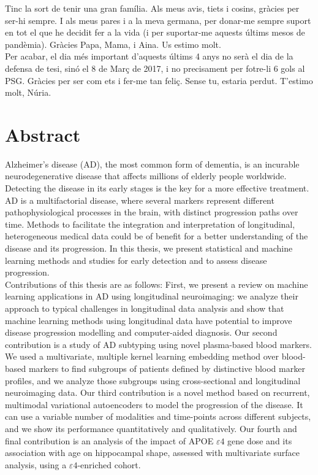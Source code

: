 \documentclass[12pt, b5paper,twoside]{tesi_upf}
\begin{document}
Tinc la sort de tenir una gran família. Als meus avis, tiets i cosins, gràcies per ser-hi sempre. I als meus pares i a la meva germana, per donar-me sempre suport en tot el que he decidit fer a la vida (i per suportar-me aquests últims mesos de pandèmia). Gràcies Papa, Mama, i Aina. Us estimo molt. \\

Per acabar, el dia més important d'aquests últims 4 anys no serà el dia de la defensa de tesi, sinó el 8 de Març de 2017, i no precisament per fotre-li 6 gols al PSG. Gràcies per ser com ets i fer-me tan feliç. Sense tu, estaria perdut. T'estimo molt, Núria. \\

\cleardoublepage


\section*{\Large \sffamily Abstract}
Alzheimer's disease (AD), the most common form of dementia, is an incurable neurodegenerative disease that affects millions of elderly people worldwide. Detecting the disease in its early stages is the key for a more effective treatment. AD is a multifactorial disease, where several markers represent different pathophysiological processes in the brain, with distinct progression paths over time. Methods to facilitate the integration and interpretation of longitudinal, heterogeneous medical data could be of benefit for a better understanding of the disease and its progression. In this thesis, we present statistical and machine learning methods and studies for early detection and to assess disease progression. \\

Contributions of this thesis are as follows: First, we present a review on machine learning applications in AD using longitudinal neuroimaging: we analyze their approach to typical challenges in longitudinal data analysis and show that machine learning methods using longitudinal data have potential to improve disease progression modelling and computer-aided diagnosis. Our second contribution is a study of AD subtyping using novel plasma-based blood markers. We used a multivariate, multiple kernel learning embedding method over blood-based markers to find subgroups of patients defined by distinctive blood marker profiles, and we analyze those subgroups using cross-sectional and longitudinal neuroimaging data. Our third contribution is a novel method based on recurrent, multimodal variational autoencoders to model the progression of the disease. It can use a variable number of modalities and time-points across different subjects, and we show its performance quantitatively and qualitatively. Our fourth and final contribution is an analysis of the impact of APOE $\varepsilon4$ gene dose and its association with age on hippocampal shape, assessed with multivariate surface analysis, using a $\varepsilon4$-enriched cohort.
\end{document}
